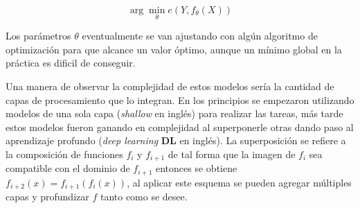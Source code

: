 \begin{equation}
	\arg \min_{\theta} e(Y, f_{\theta}(X))
\end{equation}

Los parámetros $\theta$ eventualmente se van ajustando con algún algoritmo de optimización para que alcance 
un valor óptimo, aunque un mínimo global en la práctica es dificil de conseguir.

Una manera de observar la complejidad de estos modelos sería la cantidad de capas de procesamiento que lo integran.
En los principios se empezaron utilizando modelos de una sola capa (\emph{shallow} en inglés) para realizar 
las tareas, más tarde estos modelos fueron ganando en complejidad al superponerle otras dando paso al 
aprendizaje profundo (\emph{deep learning} \textbf{DL} en inglés). La superposición se refiere
a la composición de funciones $f_i$ y $f_{i+1}$ de tal forma que la imagen de $f_i$ sea compatible con el dominio de 
$f_{i+1}$ entonces se obtiene $f_{i+2}(x) = f_{i+1}(f_i(x))$, al aplicar este esquema se pueden agregar múltiples
capas y profundizar $f$ tanto como se desee.





